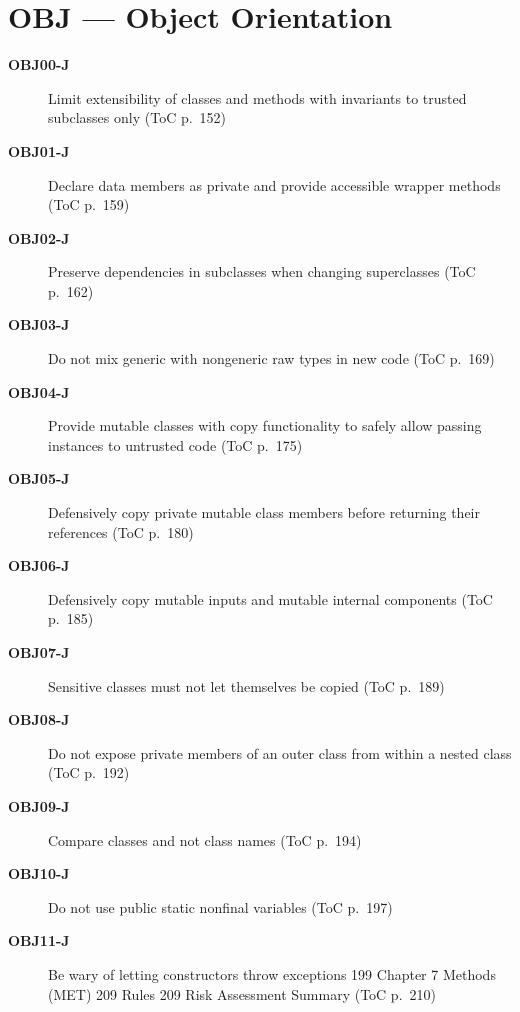 \documentclass[11pt]{report}
\begin{document}
\chapter{OBJ — Object Orientation}
\begin{description}
\item[\textbf{OBJ00-J}] Limit extensibility of classes and methods with invariants to trusted subclasses only (ToC p.~152)
\item[\textbf{OBJ01-J}] Declare data members as private and provide accessible wrapper methods (ToC p.~159)
\item[\textbf{OBJ02-J}] Preserve dependencies in subclasses when changing superclasses (ToC p.~162)
\item[\textbf{OBJ03-J}] Do not mix generic with nongeneric raw types in new code (ToC p.~169)
\item[\textbf{OBJ04-J}] Provide mutable classes with copy functionality to safely allow passing instances to untrusted code (ToC p.~175)
\item[\textbf{OBJ05-J}] Defensively copy private mutable class members before returning their references (ToC p.~180)
\item[\textbf{OBJ06-J}] Defensively copy mutable inputs and mutable internal components (ToC p.~185)
\item[\textbf{OBJ07-J}] Sensitive classes must not let themselves be copied (ToC p.~189)
\item[\textbf{OBJ08-J}] Do not expose private members of an outer class from within a nested class (ToC p.~192)
\item[\textbf{OBJ09-J}] Compare classes and not class names (ToC p.~194)
\item[\textbf{OBJ10-J}] Do not use public static nonfinal variables (ToC p.~197)
\item[\textbf{OBJ11-J}] Be wary of letting constructors throw exceptions 199 Chapter 7 Methods (MET) 209 Rules 209 Risk Assessment Summary (ToC p.~210)
\end{description}
\clearpage
\end{document}
